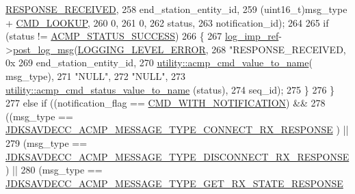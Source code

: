 \begin{DoxyCode}
      \hyperlink{namespaceavdecc__lib_ad2a3e740ca3019cf9fd0f9514afb6419a76526acf7fff481667c4ec404347c3ce}{RESPONSE\_RECEIVED},
258                                                     end\_station\_entity\_id,
259                                                     (uint16\_t)msg\_type + 
      \hyperlink{namespaceavdecc__lib_ab6b306ef981f5e21bb41ea2c2dbe8cd9a3d122abbe03d5d839b4708ad02b7586d}{CMD\_LOOKUP},
260                                                     0,
261                                                     0,
262                                                     status,
263                                                     notification\_id);
264 
265         \textcolor{keywordflow}{if} (status != \hyperlink{namespaceavdecc__lib_ae0a51eed2d4dfed01460049a240d6f34a6e7347496acf3a05a9b3dab05deb8765}{ACMP\_STATUS\_SUCCESS})
266         \{
267             \hyperlink{namespaceavdecc__lib_acbe3e2a96ae6524943ca532c87a28529}{log\_imp\_ref}->\hyperlink{classavdecc__lib_1_1log_a68139a6297697e4ccebf36ccfd02e44a}{post\_log\_msg}(\hyperlink{namespaceavdecc__lib_a501055c431e6872ef46f252ad13f85cdaf2c4481208273451a6f5c7bb9770ec8a}{LOGGING\_LEVEL\_ERROR},
268                                       \textcolor{stringliteral}{"RESPONSE\_RECEIVED, 0x%
269                                       end\_station\_entity\_id,
270                                       \hyperlink{namespaceavdecc__lib_1_1utility_a89e861257b12dded819c0e1966cbb798}{utility::acmp\_cmd\_value\_to\_name}(
      msg\_type),
271                                       \textcolor{stringliteral}{"NULL"},
272                                       \textcolor{stringliteral}{"NULL"},
273                                       \hyperlink{namespaceavdecc__lib_1_1utility_a997ca93009ef89352844dec17b15719f}{utility::acmp\_cmd\_status\_value\_to\_name}
      (status),
274                                       seq\_id);
275         \}
276     \}
277     \textcolor{keywordflow}{else} \textcolor{keywordflow}{if} ((notification\_flag == \hyperlink{namespaceavdecc__lib_aabcadff06aa62be0ce47bc0646823604aba48b8a017e06fb240b650cdea965178}{CMD\_WITH\_NOTIFICATION}) &&
278              ((msg\_type == \hyperlink{group__acmp__message__type_ga387118815f681eccff5e5b1a2025b1c4}{JDKSAVDECC\_ACMP\_MESSAGE\_TYPE\_CONNECT\_RX\_RESPONSE}
      ) ||
279               (msg\_type == \hyperlink{group__acmp__message__type_ga5bdc8bcdbdc39ae196eebe87d912f3e3}{JDKSAVDECC\_ACMP\_MESSAGE\_TYPE\_DISCONNECT\_RX\_RESPONSE}
      ) ||
280               (msg\_type == \hyperlink{group__acmp__message__type_ga30ae864d402e25fc3f458f742507ff26}{JDKSAVDECC\_ACMP\_MESSAGE\_TYPE\_GET\_RX\_STATE\_RESPONSE}
}
\end{DoxyCode}
